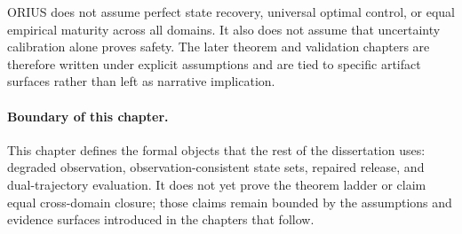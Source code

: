 ORIUS does not assume perfect state recovery, universal optimal control, or equal empirical
maturity across all domains. It also does not assume that uncertainty calibration alone proves
safety. The later theorem and validation chapters are therefore written under explicit assumptions
and are tied to specific artifact surfaces rather than left as narrative implication.

\paragraph{Boundary of this chapter.}
This chapter defines the formal objects that the rest of the dissertation uses: degraded
observation, observation-consistent state sets, repaired release, and dual-trajectory evaluation.
It does not yet prove the theorem ladder or claim equal cross-domain closure; those claims remain
bounded by the assumptions and evidence surfaces introduced in the chapters that follow.
